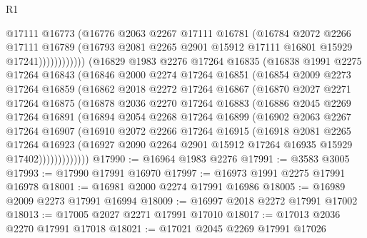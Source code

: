 \begin{lexlean}{R1}
\begin{coremodule}
                      @17111
                      @16773
                      (@16776
                        @2063
                        @2267
                        @17111
                        @16781
                        (@16784
                          @2072
                          @2266
                          @17111
                          @16789
                          (@16793 @2081 @2265 @2901 @15912 @17111 @16801 @15929 @17241))))))))))))
    (@16829
      @1983
      @2276
      @17264
      @16835
      (@16838
        @1991
        @2275
        @17264
        @16843
        (@16846
          @2000
          @2274
          @17264
          @16851
          (@16854
            @2009
            @2273
            @17264
            @16859
            (@16862
              @2018
              @2272
              @17264
              @16867
              (@16870
                @2027
                @2271
                @17264
                @16875
                (@16878
                  @2036
                  @2270
                  @17264
                  @16883
                  (@16886
                    @2045
                    @2269
                    @17264
                    @16891
                    (@16894
                      @2054
                      @2268
                      @17264
                      @16899
                      (@16902
                        @2063
                        @2267
                        @17264
                        @16907
                        (@16910
                          @2072
                          @2266
                          @17264
                          @16915
                          (@16918
                            @2081
                            @2265
                            @17264
                            @16923
                            (@16927
                              @2090
                              @2264
                              @2901
                              @15912
                              @17264
                              @16935
                              @15929
                              @17402)))))))))))))
@17990 := @16964 @1983 @2276
@17991 := @3583 @3005
@17993 := @17990 @17991 @16970
@17997 := @16973 @1991 @2275 @17991 @16978
@18001 := @16981 @2000 @2274 @17991 @16986
@18005 := @16989 @2009 @2273 @17991 @16994
@18009 := @16997 @2018 @2272 @17991 @17002
@18013 := @17005 @2027 @2271 @17991 @17010
@18017 := @17013 @2036 @2270 @17991 @17018
@18021 := @17021 @2045 @2269 @17991 @17026

\end{coremodule}
\end{lexlean}
